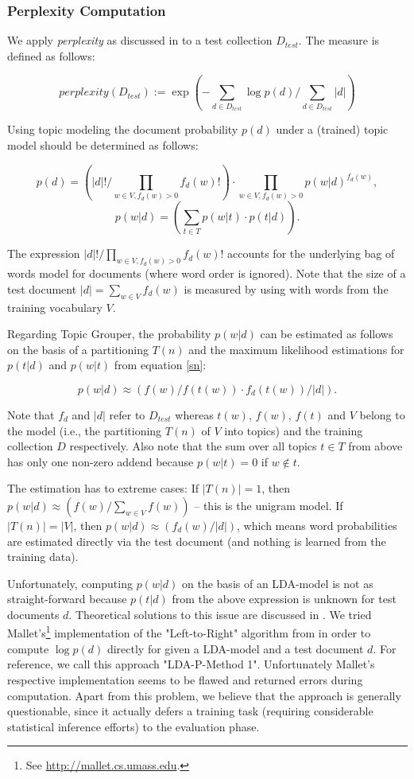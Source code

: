 \documentclass[10pt, a4paper, oneside]{article}
\begin{document}
\subsubsection{Perplexity Computation}

We apply \textit{perplexity} as discussed in \cite{Blei:2003:LDA:944919.944937} to a test collection $D_{test}$. The measure is defined as follows:

\[ perplexity(D_{test}) := \exp (- \sum_{d \in D_{test}} \log p(d) / \sum_{d \in D_{test}} |d| )\]

Using topic modeling the document probability $p(d)$ under a (trained) topic model should be determined as follows:

\[p(d) = (|d|! / \prod_{w \in V, f_d(w) > 0} f_d(w)!) \cdot \prod_{w \in V, f_d(w) > 0} p(w|d)^{f_d(w)},\] 
\[p(w|d) = (\sum_{t \in T} p(w|t) \cdot p(t|d)).\]

The expression $|d|! / \prod_{w \in V, f_d(w) > 0} f_d(w)!$ accounts for the underlying bag of words model for documents (where word order is ignored).
Note that the size of a test document $|d| = \sum_{w \in V} f_d(w)$ is measured by using with words from the training vocabulary $V$.

Regarding Topic Grouper, the probability $p(w|d)$ can be estimated as follows on the basis of a partitioning $T(n)$ and the maximum likelihood estimations for $p(t|d)$ and $p(w|t)$ from equation \ref{sn}:

\[ p(w|d) \approx (f(w) / f(t(w)) \cdot f_d(t(w)) / |d|).\]

Note that $f_d$ and $|d|$ refer to $D_{test}$ whereas $t(w)$, $f(w)$, $f(t)$ and $V$ belong to the model (i.e., the partitioning $T(n)$ of $V$ into topics) and the training collection $D$ respectively.  Also note that the sum over all topics ${t \in T}$ from above has only one non-zero addend because $p(w|t) = 0$ if $w \notin t$.

The estimation has to extreme cases: If $|T(n)| = 1$, then $p(w|d) \approx (f(w) / \sum_{w \in V} f(w))$ -- this is the unigram model. If $|T(n)| = |V|$, then  $p(w|d) \approx (f_d(w) / |d|)$, which means word probabilities are estimated directly via the test document (and nothing is learned from the training data).

Unfortunately, computing $p(w|d)$ on the basis of an LDA-model is not as straight-forward because $p(t|d)$ from the above expression is unknown for test documents $d$.
Theoretical solutions to this issue are discussed in \cite{Wallach:2009:EMT:1553374.1553515}.
We tried Mallet's\footnote{See \href{http://mallet.cs.umass.edu}{http://mallet.cs.umass.edu}.} implementation of the "Left-to-Right" algorithm from \cite{wallach08} in order to compute $\log p(d)$ directly for given a LDA-model and a test document $d$. For reference, we call this approach "LDA-P-Method 1". Unfortunately Mallet's respective implementation seems to be flawed and returned errors during computation.
Apart from this problem, we believe that the approach is generally questionable, since it actually defers a training task (requiring considerable statistical inference efforts) to the evaluation phase.
\end{document}
